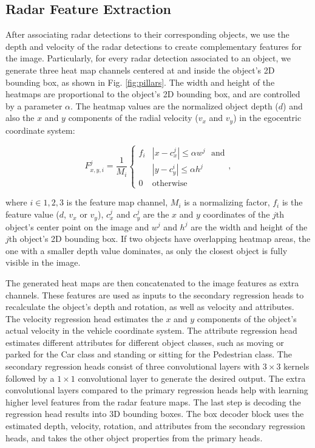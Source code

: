 \documentclass[10pt,twocolumn,letterpaper]{article}
\begin{document}
   
   \subsection{Radar Feature Extraction}
   After associating radar detections to their corresponding objects, we use the 
   depth and velocity of the radar detections to create complementary features for
   the image. Particularly, for every radar detection associated to an object, 
   we generate three heat map channels centered at and inside the object's 2D bounding 
   box, as shown in Fig. \ref{fig:pillars}. 
   The width and height of the heatmaps are proportional to the object's 2D bounding
   box, and are controlled by a parameter $\alpha$.
   The heatmap values are the normalized object depth ($d$) and also the $x$ and $y$ 
   components of the radial velocity ($v_x$ and $v_y$) in the egocentric coordinate system:
   
   \begin{equation*}
       F_{x,y,i}^{j} = \frac{1}{M_i}
       \begin{cases}
           f_i & \! |x-c_{x}^{j}|\leq \alpha w^j \hspace{8pt} \text{and}\\
           &|y-c_{y}^{i}|\leq \alpha h^j \\
           0 & \!\text{otherwise}
       \end{cases},
   \end{equation*}

   where $i \in {1,2,3}$ is the feature map channel, $M_i$ is a normalizing factor,
   $f_i$ is the feature value ($d$, $v_x$ or $v_y$), $c_{x}^{j}$ and $c_{y}^{j}$ are 
   the $x$ and $y$ coordinates of the $j$th object's center point on the image and 
   $w^j$ and $h^j$ are the width and height of the $j$th object's 2D bounding box.
   If two objects have overlapping heatmap areas, the one with a smaller depth value
   dominates, as only the closest object is fully visible in the image.
   
   The generated heat maps are then concatenated to the image features as extra channels. 
   These features are used as inputs to the secondary regression heads to recalculate 
   the object's depth and rotation, as well as velocity 
   and attributes. The velocity regression head estimates
   the $x$ and $y$ components of the object's actual velocity in the vehicle coordinate
   system. The attribute regression head estimates different attributes for different 
   object classes, such as moving or parked for the Car class and standing or sitting
   for the Pedestrian class. The secondary regression heads consist of three convolutional 
   layers with $3\times3$ kernels followed by a $1\times1$ convolutional layer to generate
   the desired output. The extra convolutional layers compared to the primary regression 
   heads help with learning higher level features from the radar feature maps. The last 
   step is decoding the regression head results into 3D bounding boxes. The box decoder
   block uses the estimated depth, velocity, rotation, and attributes from the secondary
   regression heads, and takes the other object properties from the primary heads. 
   
\end{document}

